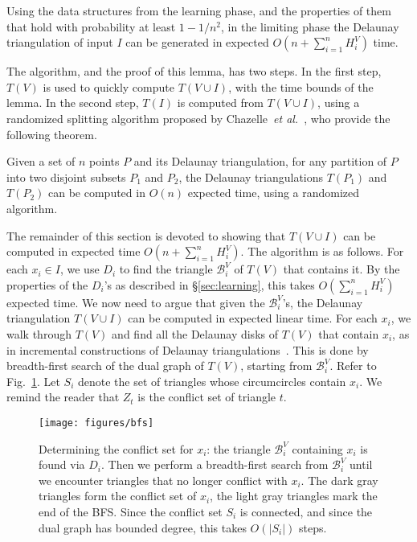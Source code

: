 \documentclass{siamltex}
\newcommand{\etal}{\emph{et al.}}
\newcommand{\tsearch}{\mathcal{B}}
\begin{document}
\begin{lemma} \label{lem:time} 
Using the data structures from
the learning phase, and the properties of them that hold
with probability at least $1-1/n^2$, in the limiting phase the 
Delaunay triangulation
of input $I$ can be generated in expected $O(n + \sum_{i=1}^n H^V_i)$ time.
\end{lemma}

The algorithm, and the proof of this lemma, has two steps.  In
the first step, $T(V)$ is used to quickly compute $T(V\cup I)$,
with the time bounds of the lemma.  In the second step,
$T(I)$ is computed from $T(V\cup I)$, using a
randomized splitting algorithm proposed by Chazelle~\etal~\cite{CDH+},
who provide the following theorem.
\begin{theorem} \cite[Theorem~3]{CDH+} 
Given a set of $n$ points $P$ and its Delaunay 
triangulation, for any partition of $P$ into two disjoint subsets $P_1$ 
and $P_2$, the Delaunay triangulations $T(P_1)$ and $T(P_2)$ can be computed 
in $O(n)$ expected time, using a randomized algorithm.
\end{theorem}

The remainder of this section 
is devoted to showing that $T(V\cup I)$ can be computed in 
expected time $O(n + \sum_{i=1}^n H^V_i)$.
The algorithm is as follows.
For each $x_i \in I$, we use $D_i$ to find the 
triangle $\tsearch_i^V$ of $T(V)$ that
contains it. By the properties of the $D_i$'s as described in
\S\ref{sec:learning}, 
this takes $O(\sum_{i=1}^n H^V_i)$ expected time. We now need
to argue that given the $\tsearch_i^V$'s, the Delaunay triangulation
$T(V \cup I)$ can be computed in expected linear time.
For each $x_i$, we walk through
$T(V)$ and find all the Delaunay disks of $T(V)$ that
contain $x_i$, as in incremental
constructions of Delaunay triangulations~\cite[Chapter~9]{deBergKrOvSc00}.
This is done by breadth-first search of the 
dual graph of $T(V)$, starting from $\tsearch_i^V$.
Refer to Fig.~\ref{fig:bfs}.
Let $S_i$ denote the set of triangles whose circumcircles contain
$x_i$. We remind the reader that $Z_t$ is the conflict set
of triangle $t$.
\begin{figure}
\begin{center}
\texttt{[image: figures/bfs]}
\end{center}
\caption{Determining the conflict set for $x_i$:
the triangle $\tsearch_i^V$ containing $x_i$ is found via $D_i$.
Then we perform a breadth-first search from $\tsearch_i^V$ until
we encounter triangles that no longer conflict with $x_i$.
The dark gray triangles form the conflict set of $x_i$, the 
light gray triangles mark the end of the BFS. Since the conflict
set $S_i$ is connected, and since the dual graph has
bounded degree, this takes $O(|S_i|)$ steps.} \label{fig:bfs}
\end{figure}
\end{document}
